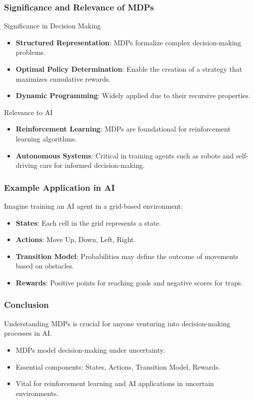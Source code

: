 \documentclass[aspectratio=169]{beamer}
\begin{document}
\begin{frame}[fragile]
    \frametitle{Significance and Relevance of MDPs}
    \begin{block}{Significance in Decision Making}
        \begin{itemize}
            \item \textbf{Structured Representation}: MDPs formalize complex decision-making problems.
            \item \textbf{Optimal Policy Determination}: Enable the creation of a strategy that maximizes cumulative rewards.
            \item \textbf{Dynamic Programming}: Widely applied due to their recursive properties.
        \end{itemize}
    \end{block}

    \begin{block}{Relevance to AI}
        \begin{itemize}
            \item \textbf{Reinforcement Learning}: MDPs are foundational for reinforcement learning algorithms.
            \item \textbf{Autonomous Systems}: Critical in training agents such as robots and self-driving cars for informed decision-making.
        \end{itemize}
    \end{block}
\end{frame}

\begin{frame}[fragile]
    \frametitle{Example Application in AI}
    Imagine training an AI agent in a grid-based environment:
    \begin{itemize}
        \item \textbf{States}: Each cell in the grid represents a state.
        \item \textbf{Actions}: Move Up, Down, Left, Right.
        \item \textbf{Transition Model}: Probabilities may define the outcome of movements based on obstacles.
        \item \textbf{Rewards}: Positive points for reaching goals and negative scores for traps.
    \end{itemize}
\end{frame}

\begin{frame}[fragile]
    \frametitle{Conclusion}
    Understanding MDPs is crucial for anyone venturing into decision-making processes in AI. 
    \begin{itemize}
        \item MDPs model decision-making under uncertainty.
        \item Essential components: States, Actions, Transition Model, Rewards.
        \item Vital for reinforcement learning and AI applications in uncertain environments.
    \end{itemize}
\end{frame}
\end{document}
